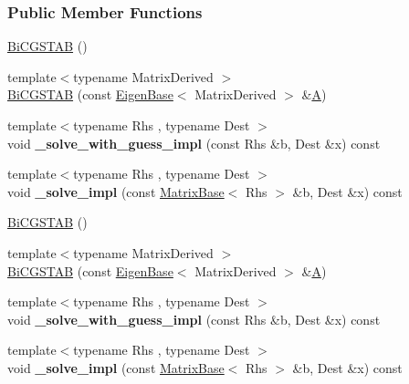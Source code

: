 \subsubsection*{Public Member Functions}
\begin{DoxyCompactItemize}
\item 
\hyperlink{group___iterative_linear_solvers___module_ae1a0df6ef6e947256c3cb83ce7df7eda}{Bi\+C\+G\+S\+T\+AB} ()
\item 
{\footnotesize template$<$typename Matrix\+Derived $>$ }\\\hyperlink{group___iterative_linear_solvers___module_a5842afd9566e254bc727de1fd7f46362}{Bi\+C\+G\+S\+T\+AB} (const \hyperlink{group___core___module_struct_eigen_1_1_eigen_base}{Eigen\+Base}$<$ Matrix\+Derived $>$ \&\hyperlink{group___core___module_class_eigen_1_1_matrix}{A})
\item 
\mbox{\label{group___iterative_linear_solvers___module_afb1eb9f5b3fa3b666f3871d5041dda11}} 
{\footnotesize template$<$typename Rhs , typename Dest $>$ }\\void {\bfseries \+\_\+solve\+\_\+with\+\_\+guess\+\_\+impl} (const Rhs \&b, Dest \&x) const
\item 
\mbox{\label{group___iterative_linear_solvers___module_a7fe02808db7ebde7a029c5031e8f72dc}} 
{\footnotesize template$<$typename Rhs , typename Dest $>$ }\\void {\bfseries \+\_\+solve\+\_\+impl} (const \hyperlink{group___core___module_class_eigen_1_1_matrix_base}{Matrix\+Base}$<$ Rhs $>$ \&b, Dest \&x) const
\item 
\hyperlink{group___iterative_linear_solvers___module_ae1a0df6ef6e947256c3cb83ce7df7eda}{Bi\+C\+G\+S\+T\+AB} ()
\item 
{\footnotesize template$<$typename Matrix\+Derived $>$ }\\\hyperlink{group___iterative_linear_solvers___module_a5842afd9566e254bc727de1fd7f46362}{Bi\+C\+G\+S\+T\+AB} (const \hyperlink{group___core___module_struct_eigen_1_1_eigen_base}{Eigen\+Base}$<$ Matrix\+Derived $>$ \&\hyperlink{group___core___module_class_eigen_1_1_matrix}{A})
\item 
\mbox{\label{group___iterative_linear_solvers___module_afb1eb9f5b3fa3b666f3871d5041dda11}} 
{\footnotesize template$<$typename Rhs , typename Dest $>$ }\\void {\bfseries \+\_\+solve\+\_\+with\+\_\+guess\+\_\+impl} (const Rhs \&b, Dest \&x) const
\item 
\mbox{\label{group___iterative_linear_solvers___module_a7fe02808db7ebde7a029c5031e8f72dc}} 
{\footnotesize template$<$typename Rhs , typename Dest $>$ }\\void {\bfseries \+\_\+solve\+\_\+impl} (const \hyperlink{group___core___module_class_eigen_1_1_matrix_base}{Matrix\+Base}$<$ Rhs $>$ \&b, Dest \&x) const
\end{DoxyCompactItemize}
